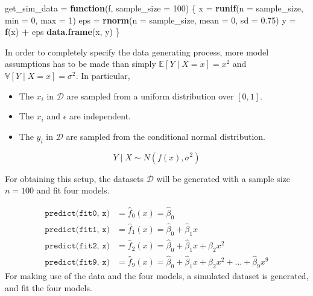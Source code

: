 \documentclass[]{report}
\newenvironment{Shaded}{\begin{snugshade}}{\end{snugshade}}
\newcommand{\KeywordTok}[1]{\textcolor[rgb]{0.13,0.29,0.53}{\textbf{#1}}}
\newcommand{\DataTypeTok}[1]{\textcolor[rgb]{0.13,0.29,0.53}{#1}}
\newcommand{\DecValTok}[1]{\textcolor[rgb]{0.00,0.00,0.81}{#1}}
\newcommand{\FloatTok}[1]{\textcolor[rgb]{0.00,0.00,0.81}{#1}}
\newcommand{\StringTok}[1]{\textcolor[rgb]{0.31,0.60,0.02}{#1}}
\newcommand{\ControlFlowTok}[1]{\textcolor[rgb]{0.13,0.29,0.53}{\textbf{#1}}}
\newcommand{\OperatorTok}[1]{\textcolor[rgb]{0.81,0.36,0.00}{\textbf{#1}}}
\newcommand{\NormalTok}[1]{#1}
\providecommand{\tightlist}{%
  \setlength{\itemsep}{0pt}\setlength{\parskip}{0pt}}
\begin{document}
\begin{Shaded}
\begin{Highlighting}[]
\NormalTok{get_sim_data =}\StringTok{ }\ControlFlowTok{function}\NormalTok{(f, }\DataTypeTok{sample_size =} \DecValTok{100}\NormalTok{) \{}
\NormalTok{  x =}\StringTok{ }\KeywordTok{runif}\NormalTok{(}\DataTypeTok{n =}\NormalTok{ sample_size, }\DataTypeTok{min =} \DecValTok{0}\NormalTok{, }\DataTypeTok{max =} \DecValTok{1}\NormalTok{)}
\NormalTok{  eps =}\StringTok{ }\KeywordTok{rnorm}\NormalTok{(}\DataTypeTok{n =}\NormalTok{ sample_size, }\DataTypeTok{mean =} \DecValTok{0}\NormalTok{, }\DataTypeTok{sd =} \FloatTok{0.75}\NormalTok{)}
\NormalTok{  y =}\StringTok{ }\KeywordTok{f}\NormalTok{(x) }\OperatorTok{+}\StringTok{ }\NormalTok{eps}
  \KeywordTok{data.frame}\NormalTok{(x, y)}
\NormalTok{\}}
\end{Highlighting}
\end{Shaded}

In order to completely specify the data generating process, more model
assumptions has to be made than simply
\(\mathbb{E}[Y \mid X = x] = x^2\) and
\(\mathbb{V}[Y \mid X = x] = \sigma ^ 2\). In particular,

\begin{itemize}
\tightlist
\item
  The \(x_i\) in \(\mathcal{D}\) are sampled from a uniform distribution
  over \([0, 1]\).
\item
  The \(x_i\) and \(\epsilon\) are independent.
\item
  The \(y_i\) in \(\mathcal{D}\) are sampled from the conditional normal
  distribution.
\end{itemize}

\[
Y \mid X \sim N(f(x), \sigma^2)
\]

For obtaining this setup, the datasets \(\mathcal{D}\) will be generated
with a sample size \(n = 100\) and fit four models.

\[
\begin{aligned}
\texttt{predict(fit0, x)} &= \hat{f}_0(x) = \hat{\beta}_0\\
\texttt{predict(fit1, x)} &= \hat{f}_1(x) = \hat{\beta}_0 + \hat{\beta}_1 x \\
\texttt{predict(fit2, x)} &= \hat{f}_2(x) = \hat{\beta}_0 + \hat{\beta}_1 x + \hat{\beta}_2 x^2 \\
\texttt{predict(fit9, x)} &= \hat{f}_9(x) = \hat{\beta}_0 + \hat{\beta}_1 x + \hat{\beta}_2 x^2 + \ldots + \hat{\beta}_9 x^9
\end{aligned}
\] For making use of the data and the four models, a simulated dataset
is generated, and fit the four models.
\end{document}
